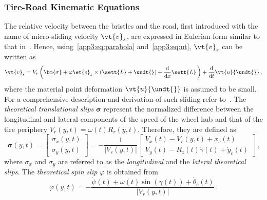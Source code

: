 
\subsubsection{Tire-Road Kinematic Equations}
\label{app3:sec:kinematic_equations}

The relative velocity between the bristles and the road, first introduced with the name of micro-sliding velocity $\vt{v}_s$, are expressed in Eulerian form similar to that in~\cite{romano2019novel, romano2020unsteadystate, romano2022brush, romano2022analytical, pacejka2012tire, guiggiani2014science, limebeer2018dynamics}. Hence, using~\eqref{app3:eq:parabola} and~\eqref{app3:eq:ut}, $\vt{v}_s$ can be written as
%
\begin{equation}
  \vt{v}_s = V_r\left(\bm{\sigma} + \varphi\et{e}_z \times \left(\sett{L} + \undt{}\right) + \dfrac{\mathrm{d}}{\mathrm{d}x}\sett{L}\,\right) + \dfrac{\mathrm{d}}{\mathrm{d}t}\vt{u}{\undt{}} \, \text{,}
  \label{app3:eq:v_s}
\end{equation}
%
where the material point deformation $\vt{u}{\undt{}}$ is assumed to be small. For a comprehensive description and derivation of such sliding refer to~\cite{rill2020road, pacejka2012tire, guiggiani2014science, limebeer2018dynamics, romano2019novel, romano2022brush, romano2022analytical}. The \emph{theoretical translational slips} $\bm{\sigma}$ represent the normalized difference between the longitudinal and lateral components of the speed of the wheel hub and that of the tire periphery $V_r(y,t) = \omega(t)R_r(y,t)$. Therefore, they are defined as
%
\begin{equation*}
  \bm{\sigma}(y,t) =
  \begin{bmatrix}
    \sigma_x(y,t) \\[0.2em]
    \sigma_y(y,t)
  \end{bmatrix}
  = -\dfrac{1}{|V_r(y,t)|}
  \begin{bmatrix}
    V_x(t) - V_r(y,t) + \dot{x}_c(t) \\[0.2em]
    V_y(t) - R_z(t)\dot{\gamma}(t) + \dot{y}_c(t)
  \end{bmatrix} \, \text{,}
\end{equation*}
%
where $\sigma_x$ and $\sigma_y$ are referred to as the \emph{longitudinal} and the \emph{lateral theoretical slips}. The \emph{theoretical spin slip} $\varphi$ is obtained from
%
\begin{equation*}
  \varphi(y,t) = -\dfrac{\dot{\psi}(t) + \omega(t)\sin(\gamma(t)) + \dot{\theta}_c(t)}{|V_r(y,t)|} \, \text{.}
\end{equation*}
